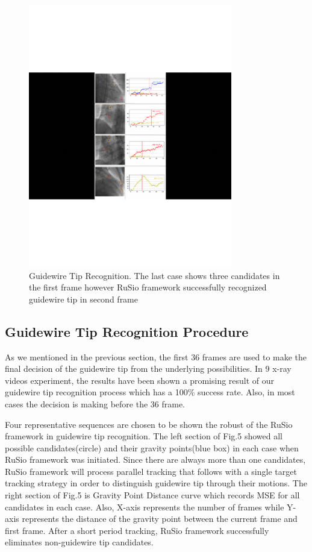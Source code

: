 \documentclass[letterpaper, 10 pt, conference]{ieeeconf}  %
\begin{document}
\begin{figure}[!htb]
	\centering  
	\includegraphics[width=3.5in]{figures/figure6}
		\caption{Guidewire Tip Recognition. The last case shows three candidates in the first frame however RuSio framework successfully recognized guidewire tip in second frame} 
	\label{fig.mcmthesis-logo} 
\end{figure}

\subsection{Guidewire Tip Recognition Procedure}
As we mentioned in the previous section, the first 36 frames are used to make the final decision of the guidewire tip from the underlying possibilities. In 9 x-ray videos experiment, the results have been shown a promising result of our guidewire tip recognition process which has a 100\% success rate. Also, in most cases the decision is making before the 36 frame.
\par
Four representative sequences are chosen to be shown the robust of the RuSio framework in guidewire tip recognition. The left section of Fig.5 showed all possible candidates(circle) and their gravity points(blue box) in each case when RuSio framework was initiated. Since there are always more than one candidates, RuSio framework will process parallel tracking that follows with a single target tracking strategy in order to distinguish guidewire tip through their motions. The right section of Fig.5 is Gravity Point Distance curve which records MSE for all candidates in each case. Also, X-axis represents the number of frames while Y-axis represents the distance of the gravity point between the current frame and first frame. After a short period tracking, RuSio framework successfully eliminates non-guidewire tip candidates. 
\end{document}
